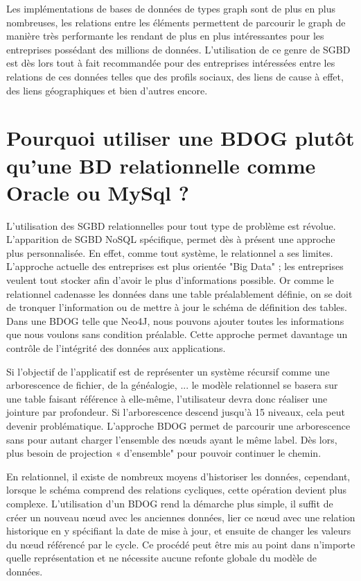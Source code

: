 \documentclass[a4paper,fleqn,12pt]{report}
\begin{document}
Les implémentations de bases de données de types graph sont de plus en plus nombreuses, les relations entre les éléments permettent de parcourir le graph de manière très performante les rendant de plus en plus intéressantes pour les entreprises possédant des millions de données. L'utilisation de ce genre de SGBD est dès lors tout à fait recommandée pour des entreprises intéressées entre les relations de ces données telles que des profils sociaux, des liens de cause à effet, des liens géographiques et bien d’autres encore.

\section*{Pourquoi utiliser une BDOG plutôt qu'une BD relationnelle comme Oracle ou MySql ?}

L’utilisation des SGBD relationnelles pour tout type de problème est révolue. L’apparition de SGBD NoSQL spécifique, permet dès à présent une approche plus personnalisée. En effet, comme tout système, le relationnel a ses limites. L’approche actuelle des entreprises est plus orientée "Big Data" ; les entreprises veulent tout stocker afin d’avoir le plus d’informations possible. Or comme le relationnel cadenasse les données dans une table préalablement définie, on se doit de tronquer l’information ou de mettre à jour le schéma de définition des tables. Dans une BDOG telle que Neo4J, nous pouvons ajouter toutes les informations que nous voulons sans condition préalable. Cette approche permet davantage un contrôle de l’intégrité des données aux applications.

Si l’objectif de l’applicatif est de représenter un système récursif comme une arborescence de fichier, de la généalogie, ... le modèle relationnel se basera sur une table faisant référence à elle-même, l’utilisateur devra donc réaliser une jointure par profondeur. Si l’arborescence descend jusqu’à 15 niveaux, cela peut devenir problématique. L’approche BDOG permet de parcourir une arborescence sans pour autant charger l’ensemble des nœuds ayant le même label. Dès lors, plus besoin de projection « d’ensemble" pour pouvoir continuer le chemin.

En relationnel, il existe de nombreux moyens d’historiser les données, cependant, lorsque le schéma comprend des relations cycliques, cette opération devient plus complexe. L’utilisation d’un BDOG rend la démarche plus simple, il suffit de créer un nouveau nœud avec les anciennes données, lier ce nœud avec une relation historique en y spécifiant la date de mise à jour, et ensuite de changer les valeurs du nœud référencé par le cycle. Ce procédé peut être mis au point dans n’importe quelle représentation et ne nécessite aucune refonte globale du modèle de données.
\end{document}
